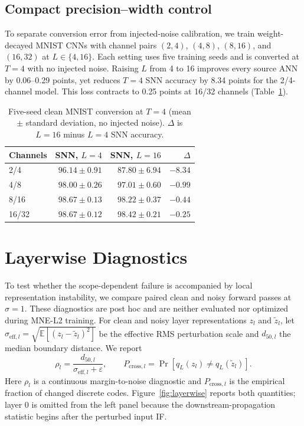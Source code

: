 \documentclass{article}
\newcommand{\pcross}[1]{P_{\mathrm{cross},#1}}
\begin{document}
\subsection{Compact precision--width control}

To separate conversion error from injected-noise calibration, we train weight-decayed MNIST CNNs with channel pairs $(2,4)$, $(4,8)$, $(8,16)$, and $(16,32)$ at $L\in\{4,16\}$. Each setting uses five training seeds and is converted at $T=4$ with no injected noise. Raising $L$ from 4 to 16 improves every source ANN by 0.06--0.29 points, yet reduces $T=4$ SNN accuracy by 8.34 points for the 2/4-channel model. This loss contracts to 0.25 points at 16/32 channels (Table~\ref{tab:precision}).

\begin{table}[t]
\caption{Five-seed clean MNIST conversion at $T=4$ (mean $\pm$ standard deviation, no injected noise). $\Delta$ is $L{=}16$ minus $L{=}4$ SNN accuracy.}
\label{tab:precision}
\centering
\small
\begin{tabular}{lrrr}
\toprule
Channels & SNN, $L=4$ & SNN, $L=16$ & $\Delta$ \\
\midrule
2/4   & $96.14\pm0.91$ & $87.80\pm6.94$ & $-8.34$ \\
4/8   & $98.00\pm0.26$ & $97.01\pm0.60$ & $-0.99$ \\
8/16  & $98.67\pm0.13$ & $98.22\pm0.37$ & $-0.44$ \\
16/32 & $98.67\pm0.12$ & $98.42\pm0.21$ & $-0.25$ \\
\bottomrule
\end{tabular}
\end{table}

\section{Layerwise Diagnostics}
\label{app:layerwise}

To test whether the scope-dependent failure is accompanied by local representation instability, we compare paired clean and noisy forward passes at $\sigma=1$. These diagnostics are post hoc and are neither evaluated nor optimized during MNE-L2 training. For clean and noisy layer representations $z_l$ and $\tilde z_l$, let $\sigma_{\mathrm{eff},l}=\sqrt{\mathbb{E}[(z_l-\tilde z_l)^2]}$ be the effective RMS perturbation scale and $d_{50,l}$ the median boundary distance. We report
\begin{equation}
\rho_l=\frac{d_{50,l}}{\sigma_{\mathrm{eff},l}+\varepsilon},
\qquad
\pcross{l}=\Pr[q_L(z_l)\neq q_L(\tilde z_l)].
\label{eq:diagnostics}
\end{equation}
Here $\rho_l$ is a continuous margin-to-noise diagnostic and $\pcross{l}$ is the empirical fraction of changed discrete codes. Figure~\ref{fig:layerwise} reports both quantities; layer 0 is omitted from the left panel because the downstream-propagation statistic begins after the perturbed input IF.
\end{document}
